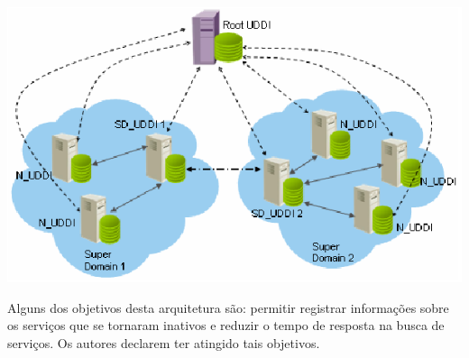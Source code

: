 \begin{center}
	\includegraphics[scale=0.6]{images/a-novel-interoperable-model-uddi.png}
	\label{fig:distributed-uddi}
\end{center}

Alguns dos objetivos desta arquitetura são: permitir registrar informações sobre os serviços que se tornaram inativos e reduzir o tempo de resposta na busca de serviços. Os autores declarem ter atingido tais objetivos.


